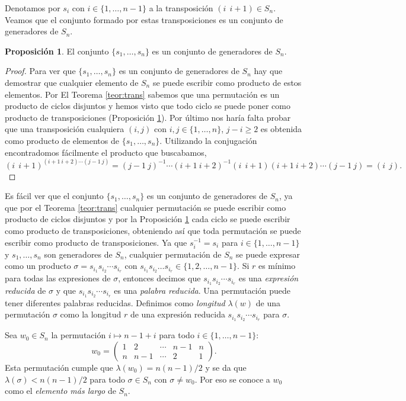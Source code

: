 \documentclass[12pt]{book}
\theoremstyle{definition}
\newtheorem{prop}{Proposición}[section]
\begin{document}
Denotamos por $s_i$ con $i\in\{1,\ldots,n-1\}$ a la transposición $(i\ \ i+1)\in S_n$. Veamos que el conjunto formado por estas transposiciones es un conjunto de generadores de $S_n$.
\begin{prop}
\label{prop:trans}
El conjunto $\{s_1,\ldots,s_n\}$ es un conjunto de generadores de $S_n$.
\end{prop}
\begin{proof}
Para ver que $\{s_1,\ldots,s_n\}$ es un conjunto de generadores de $S_n$ hay que demostrar que cualquier elemento de $S_n$ se puede escribir como producto de estos elementos. Por El Teorema \ref{teor:trans} sabemos que una permutación es un producto de ciclos disjuntos y hemos visto que todo ciclo se puede poner como producto de transposiciones (Proposición \ref{prop:trans}). Por último nos haría falta probar que una transposición cualquiera $(i,j)$ con $i,j\in\{1,\ldots,n\}$, $j-i\geq 2$ es obtenida como producto de elementos de $\{s_1,\ldots,s_n\}$. Utilizando la conjugación encontradomos fácilmente el producto que buscabamos,
$$(i\ \ i+1)^{(i+1\ i+2)\cdots(j-1\ j)}=(j-1\ j)^{-1}\cdots(i+1\ i+2)^{-1}(i\ \ i+1)(i+1\ i+2)\cdots(j-1\ j) = (i\ \ j).$$

\end{proof}



Es fácil ver que el conjunto $\{s_1,\ldots,s_n\}$ es un conjunto de generadores de $S_n$, ya que por el Teorema \ref{teor:trans} cualquier permutación se puede escribir como producto de ciclos disjuntos y por la Proposición \ref{prop:trans} cada ciclo se puede escribir como producto de transposiciones, obteniendo así que toda permutación se puede escribir como producto de transposiciones. Ya que $s_i^{-1}= s_i$ para $i\in\{1,\ldots,n-1\}$ y $s_1,\ldots,s_n$ son generadores de $S_n$, cualquier permutación de $S_n$ se puede expresar como un producto $\sigma = s_{i_1}s_{i_2}\cdots s_{i_r}$ con $s_{i_1}s_{i_2}\ldots s_{i_r}\in\{1,2,\ldots,n-1\}$. Si $r$ es mínimo para todas las expresiones de $\sigma$, entonces decimos que $s_{i_1}s_{i_2}\cdots s_{i_r}$ es una \textit{expresión reducida} de $\sigma$ y que $s_{i_1}s_{i_2}\cdots s_{i_r}$ es una \textit{palabra reducida}. Una permutación puede tener diferentes palabras reducidas. Definimos como \textit{longitud} $\lambda(w)$ de una permutación $\sigma$ como la longitud $r$ de una expresión reducida $s_{i_1}s_{i_2}\cdots s_{i_r}$ para $\sigma$.

Sea $w_0\in S_n$ la permutación $i\mapsto n-1+i$ para todo $i \in\{ 1,\ldots,n-1\}$:
$$w_0 = 
\begin{pmatrix} 
1 & 2 & \cdots & n-1 & n \\
n & n-1 & \cdots & 2 & 1
\end{pmatrix}
.$$
Esta permutación cumple que $\lambda(w_0)=n(n-1)/2$ y se da que $\lambda(\sigma)<n(n-1)/2$ para todo $\sigma\in S_n$ con $\sigma\neq w_0$. Por eso se conoce a $w_0$ como el \textit{elemento más largo} de $S_n$.
\end{document}
